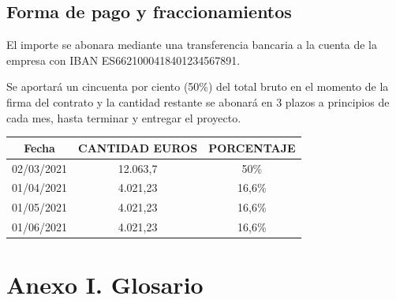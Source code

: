 \documentclass{article}
\begin{document}
\subsection{Forma de pago y fraccionamientos}

El importe se abonara mediante una transferencia bancaria a la cuenta de la empresa con IBAN ES6621000418401234567891.

Se aportará un cincuenta por ciento (50\%) del total bruto en el momento de la firma del contrato y la cantidad restante se abonará en 3 plazos a principios de cada mes, hasta terminar y entregar el proyecto. 

\begin{table}[H]
    \centering
    \begin{tabular}{| c | c | c |}
    \hline
        Fecha &  CANTIDAD EUROS & PORCENTAJE  \\ \hline
        02/03/2021 & 12.063,7 & 50\% \\ \hline
        01/04/2021 & 4.021,23 & 16,6\% \\ \hline
        01/05/2021 & 4.021,23 & 16,6\% \\ \hline
        01/06/2021 & 4.021,23 & 16,6\% \\ \hline
    \end{tabular}
\end{table}



\pagebreak

\section*{Anexo I. Glosario}
\end{document}
